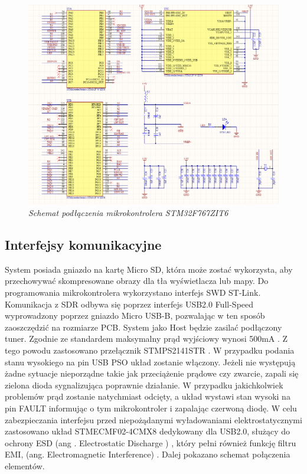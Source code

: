 \documentclass[eng,printmode]{mgr}
\begin{document}
\begin{figure}[!h]
    \centering
    \includegraphics[height=\textwidth, angle=90]{schematics/uC.png}
    \caption{\textit{Schemat podłączenia mikrokontrolera STM32F767ZIT6}}
\end{figure}

\subsection*{Interfejsy komunikacyjne}
System posiada gniazdo na kartę Micro SD, która może zostać wykorzysta, aby przechowywać  skompresowane obrazy dla tła wyświetlacza lub mapy. Do programowania mikrokontrolera wykorzystano interfejs SWD ST-Link. Komunikacja z SDR odbywa się poprzez interfejs USB2.0 Full-Speed wyprowadzony poprzez gniazdo Micro USB-B, pozwalając w ten sposób zaoszczędzić na rozmiarze PCB. System jako Host będzie zasilać podłączony tuner. Zgodnie ze standardem maksymalny prąd wyjściowy wynosi 500mA \cite{usbSpec}. Z tego powodu zastosowano przełącznik STMPS2141STR \cite{usbPower}. W przypadku podania stanu wysokiego na pin USB PSO układ zostanie włączony. Jeżeli nie występują żadne sytuacje nieporządne takie jak przeciążenie prądowe czy zwarcie, zapali się zielona dioda sygnalizująca poprawnie działanie. W przypadku jakichkolwiek problemów prąd zostanie natychmiast odcięty, a układ wystawi stan wysoki na pin FAULT informując o tym mikrokontroler i zapalając czerwoną diodę. W celu zabezpieczania interfejsu przed niepożądanymi wyładowaniami elektrostatycznymi zastosowano układ STMECMF02-4CMX8 dedykowany dla USB2.0, służący do ochrony ESD (ang . Electrostatic Discharge ) , który pełni również funkcję filtru EMI, (ang. Electromagnetic Interference) \cite{emi}. Dalej pokazano schemat połączenia elementów.
\end{document}
